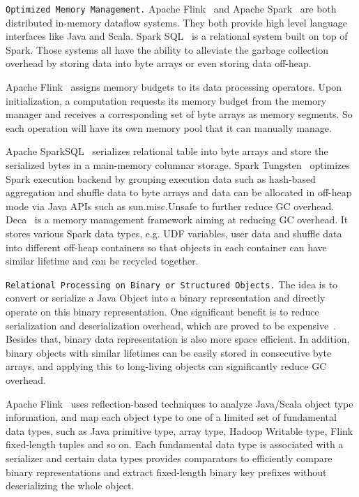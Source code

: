\vspace{5pt}
\texttt {Optimized Memory Management.} 
Apache Flink~\cite{alexandrov2014stratosphere} and Apache
Spark~\cite{zaharia2012resilient} are both distributed in-memory
dataflow systems. They both provide high level language interfaces like Java and Scala.
Spark SQL~\cite{armbrust2015spark} is a relational system built on top
of Spark. Those systems all have the
ability to alleviate the garbage collection overhead  by storing data
into byte arrays or even storing data off-heap.

Apache Flink~\cite{alexandrov2014stratosphere} assigns memory budgets to its data processing operators. Upon
initialization, a computation requests its memory budget from the
memory manager and receives a corresponding set of byte arrays as memory segments. So
each operation will have its own memory pool that it can manually
manage. 

Apache SparkSQL~\cite{armbrust2015spark} serializes 
relational table into byte arrays and store the serialized bytes
in a main-memory columnar storage. Spark Tungsten~\cite{tungsten}
optimizes Spark execution backend by grouping execution
data such as hash-based aggregation and shuffle data
to byte arrays and data can be allocated in off-heap mode via
Java APIs such as sun.misc.Unsafe to
further reduce GC overhead. Deca~\cite{lu2016lifetime} is a memory management framework aiming at
reducing GC overhead. It stores
various Spark data types, e.g. UDF variables, user data and
shuffle data into different
off-heap containers so that objects in each container can have similar
lifetime and can be recycled together.

\vspace{5pt}
\texttt {Relational Processing on Binary or Structured Objects.} The idea is to convert or
serialize a Java Object into a binary representation and directly
operate on this binary representation. One significant benefit is to reduce serialization and
deserialization overhead, which are proved to be expensive~\cite{ousterhout2015making}. 
Besides that, binary data representation is also more space efficient. In addition, binary objects
with similar lifetimes can be easily stored in consecutive byte
arrays, and applying this to long-living objects can significantly reduce GC overhead.

Apache Flink~\cite{alexandrov2014stratosphere} uses reflection-based
techniques to analyze Java/Scala object type information, and
map each object type to one of a limited set of
fundamental data types, such as Java primitive type, array type,
Hadoop Writable type, Flink fixed-length tuples and so on. Each
fundamental data type is associated with a serializer and certain data
types provides comparators to efficiently compare binary
representations and extract fixed-length binary key prefixes without
deserializing the whole object.

